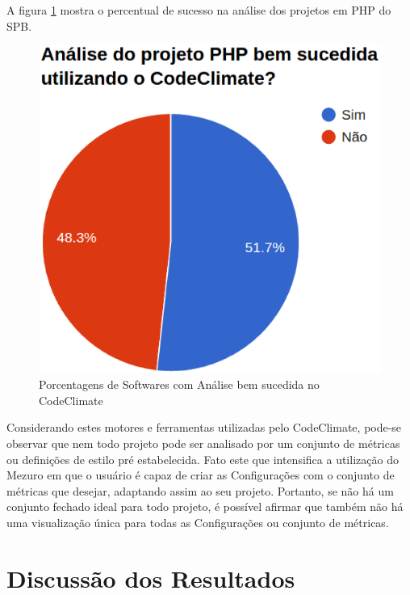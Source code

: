 A figura \ref{fig:is_codeclimate_php_success} mostra o percentual de sucesso na
análise dos projetos em PHP do SPB.

\begin{figure}[!htb]
	\centering
    \includegraphics[keepaspectratio=true,scale=0.6]
    {figuras/is_codeclimate_php_success.eps}
  \caption{Porcentagens de Softwares com Análise bem sucedida no CodeClimate}
  \label{fig:is_codeclimate_php_success}
\end{figure}

\newpage

Considerando estes motores e ferramentas utilizadas pelo CodeClimate, pode-se
observar que nem todo projeto pode ser analisado por um conjunto de métricas ou
definições de estilo pré estabelecida. Fato este que intensifica a utilização do
Mezuro em que o usuário é capaz de criar as Configurações com o conjunto de
métricas que desejar, adaptando assim ao seu projeto. Portanto, se não há um
conjunto fechado ideal para todo projeto, é possível afirmar que também não há
uma visualização única para todas as Configurações ou conjunto de métricas.


\section{Discussão dos Resultados}

